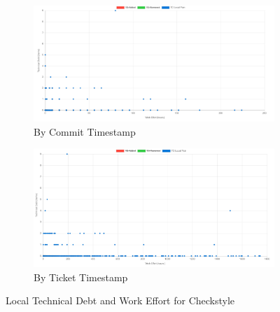 \documentclass{mpaper}
\begin{document}
\begin{figure}[htp]
	\centering
	\begin{subfigure}{.45\textwidth}
		\includegraphics[width=\linewidth]{images/checkstyle_local_debt_commit.png}
		\caption{By Commit Timestamp}
		\label{fig:collections-td-timeline}
	\end{subfigure}
	\begin{subfigure}{.45\textwidth}
		\includegraphics[width=\linewidth]{images/checkstyle_local_debt_ticket.png}
		\caption{By Ticket Timestamp}
		\label{fig:spring-td-timeline}
	\end{subfigure}
	\caption{Local Technical Debt and Work Effort for Checkstyle}
	\label{fig:td-local-debt}
\end{figure}
\end{document}
